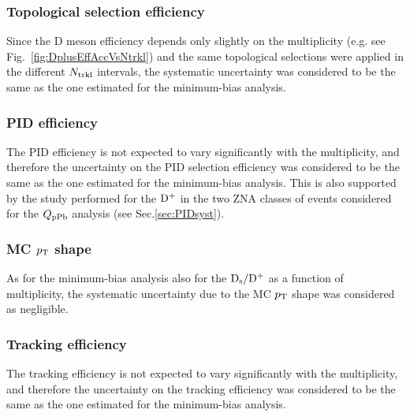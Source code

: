 \subsubsection{Topological selection efficiency}
Since the D meson efficiency depends only slightly on the multiplicity (e.g. see Fig.~\ref{fig:DplusEffAccVsNtrkl}) and the same topological selections were applied in the different $N_{\rm trkl}$ intervals, the systematic uncertainty was considered to be the same as the one estimated for the minimum-bias analysis.

\subsubsection{PID efficiency}
The PID efficiency is not expected to vary significantly with the multiplicity, and therefore the uncertainty on the PID selection efficiency was considered to be the same as the one estimated for the minimum-bias analysis. This is also supported by the study performed for the ${\rm D^+}$ in the two ZNA classes of events considered for the $Q_{\rm pPb}$ analysis (see Sec.\ref{sec:PIDsyst}).

\subsubsection{MC $p_{\rm T}$ shape}
As for the minimum-bias analysis also for the ${\rm D_s}/{\rm D^+}$ as a function of multiplicity, the systematic uncertainty due to the MC $p_{\rm T}$ shape was considered as negligible.

\subsubsection{Tracking efficiency}
The tracking efficiency is not expected to vary significantly with the multiplicity, and therefore the uncertainty on the tracking efficiency was considered to be the same as the one estimated for the minimum-bias analysis.

